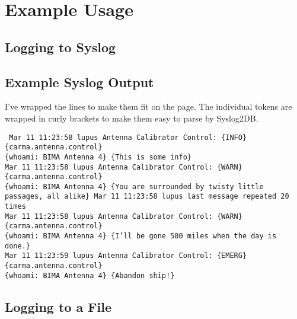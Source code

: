 \documentclass[preprint]{aastex}
\begin{document}
\appendix
\clearpage
\section{Example Usage}
\subsection{Logging to Syslog}


\clearpage
\subsection{Example Syslog Output}

I've wrapped the lines to make them fit on the page.  The individual
tokens are wrapped in curly brackets to make them easy to parse
by Syslog2DB.

\noindent
{\tt
Mar 11 11:23:58 lupus Antenna Calibrator Control:  \{INFO\} \{carma.antenna.control\}\\
\hspace*{0.25in} \{whoami: BIMA Antenna 4\} \{This is some info\} \\
Mar 11 11:23:58 lupus Antenna Calibrator Control:  \{WARN\} \{carma.antenna.control\}\\
\hspace*{0.25in} \{whoami: BIMA Antenna 4\} \{You are surrounded by twisty little passages, all alike\} 
Mar 11 11:23:58 lupus last message repeated 20 times\\
Mar 11 11:23:58 lupus Antenna Calibrator Control:  \{WARN\} \{carma.antenna.control\}\\
\hspace*{0.25in} \{whoami: BIMA Antenna 4\} \{I'll be gone 500 miles when the day is done.\}\\ 
Mar 11 11:23:59 lupus Antenna Calibrator Control:  \{EMERG\} \{carma.antenna.control\}\\
\hspace*{0.25in} \{whoami: BIMA Antenna 4\} \{Abandon ship!\} 
}

\clearpage
\subsection{Logging to a File}

\end{document}

